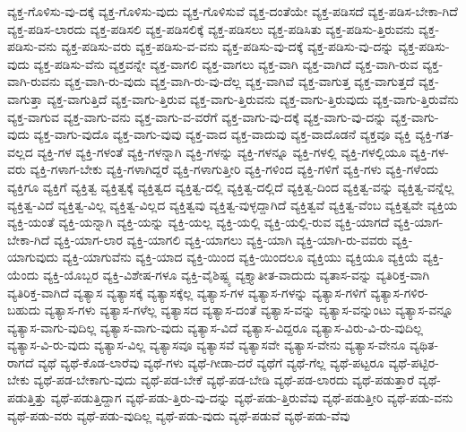 {ವ್ಯಕ್ತ-ಗೊಳಿಸು-ವು-ದಕ್ಕೆ
ವ್ಯಕ್ತ-ಗೊಳಿಸು-ವುದು
ವ್ಯಕ್ತ-ಗೊಳಿಸುವೆ
ವ್ಯಕ್ತ-ದಂತೆಯೇ
ವ್ಯಕ್ತ-ಪಡಿಸದೆ
ವ್ಯಕ್ತ-ಪಡಿಸ-ಬೇಕಾ-ಗಿದೆ
ವ್ಯಕ್ತ-ಪಡಿಸ-ಲಾರದು
ವ್ಯಕ್ತ-ಪಡಿಸಲಿ
ವ್ಯಕ್ತ-ಪಡಿಸಲಿಕ್ಕೆ
ವ್ಯಕ್ತ-ಪಡಿಸಲು
ವ್ಯಕ್ತ-ಪಡಿಸಿತು
ವ್ಯಕ್ತ-ಪಡಿಸು-ತ್ತಿರುವನು
ವ್ಯಕ್ತ-ಪಡಿಸು-ವನು
ವ್ಯಕ್ತ-ಪಡಿಸು-ವರು
ವ್ಯಕ್ತ-ಪಡಿಸು-ವ-ವನು
ವ್ಯಕ್ತ-ಪಡಿಸು-ವು-ದಕ್ಕೆ
ವ್ಯಕ್ತ-ಪಡಿಸು-ವು-ದನ್ನು
ವ್ಯಕ್ತ-ಪಡಿಸು-ವುದು
ವ್ಯಕ್ತ-ಪಡಿಸು-ವೆನು
ವ್ಯಕ್ತವನ್ನೇ
ವ್ಯಕ್ತ-ವಾಗಲಿ
ವ್ಯಕ್ತ-ವಾಗಲು
ವ್ಯಕ್ತ-ವಾಗಿ
ವ್ಯಕ್ತ-ವಾಗಿದೆ
ವ್ಯಕ್ತ-ವಾಗಿ-ರುವ
ವ್ಯಕ್ತ-ವಾಗಿ-ರುವನು
ವ್ಯಕ್ತ-ವಾಗಿ-ರು-ವುದು
ವ್ಯಕ್ತ-ವಾಗಿ-ರು-ವು-ದೆಲ್ಲ
ವ್ಯಕ್ತ-ವಾಗಿವೆ
ವ್ಯಕ್ತ-ವಾಗುತ್ತ
ವ್ಯಕ್ತ-ವಾಗುತ್ತದೆ
ವ್ಯಕ್ತ-ವಾಗುತ್ತಾ
ವ್ಯಕ್ತ-ವಾಗುತ್ತಿದೆ
ವ್ಯಕ್ತ-ವಾಗು-ತ್ತಿರುವ
ವ್ಯಕ್ತ-ವಾಗು-ತ್ತಿರುವನು
ವ್ಯಕ್ತ-ವಾಗು-ತ್ತಿರುವುದು
ವ್ಯಕ್ತ-ವಾಗು-ತ್ತಿರುವೆನು
ವ್ಯಕ್ತ-ವಾಗುವ
ವ್ಯಕ್ತ-ವಾಗು-ವನು
ವ್ಯಕ್ತ-ವಾಗು-ವ-ವರೆಗೆ
ವ್ಯಕ್ತ-ವಾಗು-ವು-ದಕ್ಕೆ
ವ್ಯಕ್ತ-ವಾಗು-ವು-ದನ್ನು
ವ್ಯಕ್ತ-ವಾಗು-ವುದು
ವ್ಯಕ್ತ-ವಾಗು-ವುದೊ
ವ್ಯಕ್ತ-ವಾಗು-ವುವು
ವ್ಯಕ್ತ-ವಾದ
ವ್ಯಕ್ತ-ವಾದುವು
ವ್ಯಕ್ತ-ವಾದೊಡನೆ
ವ್ಯಕ್ತವೂ
ವ್ಯಕ್ತಿ
ವ್ಯಕ್ತಿ-ಗತ-ವಲ್ಲದ
ವ್ಯಕ್ತಿ-ಗಳ
ವ್ಯಕ್ತಿ-ಗಳಂತೆ
ವ್ಯಕ್ತಿ-ಗಳನ್ನಾಗಿ
ವ್ಯಕ್ತಿ-ಗಳನ್ನು
ವ್ಯಕ್ತಿ-ಗಳನ್ನೂ
ವ್ಯಕ್ತಿ-ಗಳಲ್ಲಿ
ವ್ಯಕ್ತಿ-ಗಳಲ್ಲಿಯೂ
ವ್ಯಕ್ತಿ-ಗಳ-ವರು
ವ್ಯಕ್ತಿ-ಗಳಾಗ-ಬೇಕು
ವ್ಯಕ್ತಿ-ಗಳಾಗಿದ್ದರೆ
ವ್ಯಕ್ತಿ-ಗಳಾಗುತ್ತೀರಿ
ವ್ಯಕ್ತಿ-ಗಳಿಂದ
ವ್ಯಕ್ತಿ-ಗಳಿಗೆ
ವ್ಯಕ್ತಿ-ಗಳು
ವ್ಯಕ್ತಿ-ಗಳೆಂದು
ವ್ಯಕ್ತಿಗೂ
ವ್ಯಕ್ತಿಗೆ
ವ್ಯಕ್ತಿತ್ವ
ವ್ಯಕ್ತಿತ್ವಕ್ಕೆ
ವ್ಯಕ್ತಿತ್ವದ
ವ್ಯಕ್ತಿತ್ವ-ದಲ್ಲಿ
ವ್ಯಕ್ತಿತ್ವ-ದಲ್ಲಿದೆ
ವ್ಯಕ್ತಿತ್ವ-ದಿಂದ
ವ್ಯಕ್ತಿತ್ವ-ವನ್ನು
ವ್ಯಕ್ತಿತ್ವ-ವನ್ನೆಲ್ಲ
ವ್ಯಕ್ತಿತ್ವ-ವಿದೆ
ವ್ಯಕ್ತಿತ್ವ-ವಿಲ್ಲ
ವ್ಯಕ್ತಿತ್ವ-ವಿಲ್ಲದ
ವ್ಯಕ್ತಿತ್ವವು
ವ್ಯಕ್ತಿತ್ವ-ವುಳ್ಳದ್ದಾಗಿದೆ
ವ್ಯಕ್ತಿತ್ವವೆ
ವ್ಯಕ್ತಿತ್ವ-ವೆಂಬ
ವ್ಯಕ್ತಿತ್ವವೇ
ವ್ಯಕ್ತಿಯ
ವ್ಯಕ್ತಿ-ಯಂತೆ
ವ್ಯಕ್ತಿ-ಯನ್ನಾಗಿ
ವ್ಯಕ್ತಿ-ಯನ್ನು
ವ್ಯಕ್ತಿ-ಯಲ್ಲ
ವ್ಯಕ್ತಿ-ಯಲ್ಲಿ
ವ್ಯಕ್ತಿ-ಯಲ್ಲಿ-ರುವ
ವ್ಯಕ್ತಿ-ಯಾಗದೆ
ವ್ಯಕ್ತಿ-ಯಾಗ-ಬೇಕಾ-ಗಿದೆ
ವ್ಯಕ್ತಿ-ಯಾಗ-ಲಾರ
ವ್ಯಕ್ತಿ-ಯಾಗಲಿ
ವ್ಯಕ್ತಿ-ಯಾಗಲು
ವ್ಯಕ್ತಿ-ಯಾಗಿ
ವ್ಯಕ್ತಿ-ಯಾಗಿ-ರು-ವವರು
ವ್ಯಕ್ತಿ-ಯಾಗುವುದು
ವ್ಯಕ್ತಿ-ಯಾಗುವೆನು
ವ್ಯಕ್ತಿ-ಯಾದ
ವ್ಯಕ್ತಿ-ಯಿಂದ
ವ್ಯಕ್ತಿ-ಯಿಂದಲೂ
ವ್ಯಕ್ತಿಯು
ವ್ಯಕ್ತಿಯೂ
ವ್ಯಕ್ತಿಯೆ
ವ್ಯಕ್ತಿ-ಯೆಂದು
ವ್ಯಕ್ತಿ-ಯೊಬ್ಬರ
ವ್ಯಕ್ತಿ-ವಿಶೇಷ-ಗಳೂ
ವ್ಯಕ್ತಿ-ವೈಶಿಷ್ಟ್ಯ
ವ್ಯಕ್ತ್ಯಾತೀತ-ವಾದುದು
ವ್ಯತಾಸ-ವನ್ನು
ವ್ಯತಿರಿಕ್ತ-ವಾಗಿ
ವ್ಯತಿರಿಕ್ತ-ವಾಗಿದೆ
ವ್ಯತ್ಯಾಸ
ವ್ಯತ್ಯಾಸಕ್ಕೆ
ವ್ಯತ್ಯಾಸಕ್ಕೆಲ್ಲ
ವ್ಯತ್ಯಾಸ-ಗಳ
ವ್ಯತ್ಯಾಸ-ಗಳನ್ನು
ವ್ಯತ್ಯಾಸ-ಗಳಿಗೆ
ವ್ಯತ್ಯಾಸ-ಗಳಿರ-ಬಹುದು
ವ್ಯತ್ಯಾಸ-ಗಳು
ವ್ಯತ್ಯಾಸ-ಗಳೆಲ್ಲ
ವ್ಯತ್ಯಾಸದ
ವ್ಯತ್ಯಾಸ-ದಂತೆ
ವ್ಯತ್ಯಾಸ-ವನ್ನು
ವ್ಯತ್ಯಾಸ-ವನ್ನುಂಟು
ವ್ಯತ್ಯಾಸ-ವನ್ನೂ
ವ್ಯತ್ಯಾಸ-ವಾಗು-ವುದಿಲ್ಲ
ವ್ಯತ್ಯಾಸ-ವಾಗು-ವುದು
ವ್ಯತ್ಯಾಸ-ವಿದೆ
ವ್ಯತ್ಯಾಸ-ವಿದ್ದರೂ
ವ್ಯತ್ಯಾಸ-ವಿರು-ವಿ-ರು-ವುದಿಲ್ಲ
ವ್ಯತ್ಯಾಸ-ವಿ-ರು-ವುದು
ವ್ಯತ್ಯಾಸ-ವಿಲ್ಲ
ವ್ಯತ್ಯಾಸವೂ
ವ್ಯತ್ಯಾಸವೆ
ವ್ಯತ್ಯಾಸವೇ
ವ್ಯತ್ಯಾಸ-ವೇನು
ವ್ಯತ್ಯಾಸ-ವೇನೂ
ವ್ಯಥಿತ-ರಾಗದೆ
ವ್ಯಥೆ
ವ್ಯಥೆ-ಕೊಡ-ಲಾರೆವು
ವ್ಯಥೆ-ಗಳು
ವ್ಯಥೆ-ಗೀಡಾ-ದರೆ
ವ್ಯಥೆಗೆ
ವ್ಯಥೆ-ಗೆಲ್ಲ
ವ್ಯಥೆ-ಪಟ್ಟರೂ
ವ್ಯಥೆ-ಪಟ್ಟಿರ-ಬೇಕು
ವ್ಯಥೆ-ಪಡ-ಬೇಕಾಗು-ವುದು
ವ್ಯಥೆ-ಪಡ-ಬೇಕೆ
ವ್ಯಥೆ-ಪಡ-ಬೇಡಿ
ವ್ಯಥೆ-ಪಡ-ಲಾರದು
ವ್ಯಥೆ-ಪಡುತ್ತಾರೆ
ವ್ಯಥೆ-ಪಡುತ್ತಿತ್ತು
ವ್ಯಥೆ-ಪಡುತ್ತಿದ್ದಾಗ
ವ್ಯಥೆ-ಪಡು-ತ್ತಿರು-ವು-ದನ್ನು
ವ್ಯಥೆ-ಪಡು-ತ್ತಿರುವೆವು
ವ್ಯಥೆ-ಪಡುತ್ತೀರಿ
ವ್ಯಥೆ-ಪಡು-ವನು
ವ್ಯಥೆ-ಪಡು-ವರು
ವ್ಯಥೆ-ಪಡು-ವುದಿಲ್ಲ
ವ್ಯಥೆ-ಪಡು-ವುದು
ವ್ಯಥೆ-ಪಡುವೆ
ವ್ಯಥೆ-ಪಡು-ವೆವು
}
